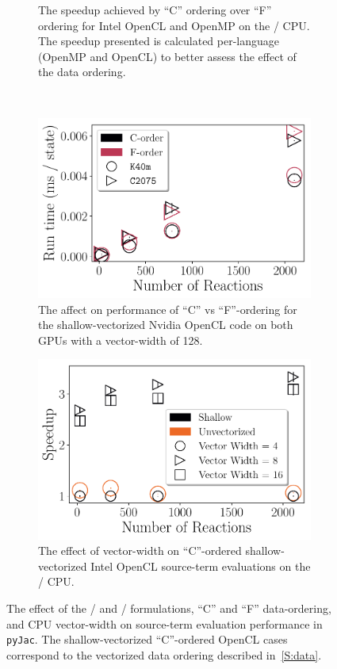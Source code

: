 \documentclass[12pt,number,sort&compress,preprint]{elsarticle}
\begin{document}
\begin{figure}[htbp]
\begin{subfigure}[t]{0.48\linewidth}
      \caption{The speedup achieved by ``C'' ordering over ``F'' ordering for Intel OpenCL and OpenMP on the \avx/ CPU.  The speedup presented is calculated per-language (OpenMP and OpenCL) to better assess the effect of the data ordering.}
      \label{F:source_cvsf}
  \end{subfigure}
  \\
  \begin{subfigure}[t]{0.48\linewidth}
      \includegraphics[width=\textwidth]{source_gpu_cvsf.pdf}
      \caption{The affect on performance of ``C'' vs ``F''-ordering for the shallow-vectorized Nvidia OpenCL code on both GPUs with a vector-width of \num{128}.}
      \label{F:source_gpu_cvsf}
  \end{subfigure}
  \hfill
  \begin{subfigure}[t]{0.48\linewidth}
      \includegraphics[width=\textwidth]{source_vector_width.pdf}
      \caption{The effect of vector-width on ``C''-ordered shallow-vectorized Intel OpenCL source-term evaluations on the \avx/ CPU.}
      \label{F:source_vector_width}
  \end{subfigure}
  \caption{The effect of the \conp/ and \conv/ formulations, ``C'' and ``F'' data-ordering, and CPU vector-width on source-term evaluation performance in \texttt{pyJac}.
  The shallow-vectorized ``C''-ordered OpenCL cases correspond to the vectorized data ordering described in~\cref{S:data}.}
  \label{f:source_permutate}
\end{figure}
\end{document}
